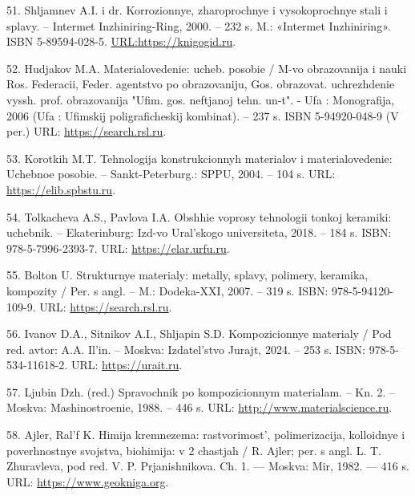 \begin{references}
51. Shljamnev A.I. i dr. Korrozionnye, zharoprochnye i vysokoprochnye
stali i splavy. – Intermet Inzhiniring-Ring, 2000. – 232 s. M.:
«Intermet Inzhiniring». ISBN
5-89594-028-5. \href{URL:https://knigogid.ru/books/1935439-korrozionnostoykie-zharostoykie-i-vysokoprochnye-stali-i-splavy-spravochnik/toread?update_page}{URL:https://knigogid.ru}.

52. Hudjakov M.A. Materialovedenie: ucheb. posobie / M-vo obrazovanija
i nauki Ros. Federacii, Feder. agentstvo po obrazovaniju,
Gos. obrazovat. uchrezhdenie vyssh. prof. obrazovanija
"Ufim. gos. neftjanoj tehn. un-t". - Ufa : Monografija, 2006 (Ufa :
Ufimskij poligraficheskij kombinat). – 237 s. ISBN 5-94920-048-9 (V
per.)
URL: \href{https://search.rsl.ru/ru/record/01002872641?ysclid=m83b6quwea630137991}{https://search.rsl.ru}.

53. Korotkih M.T. Tehnologija konstrukcionnyh materialov i
materialovedenie: Uchebnoe posobie. – Sankt-Peterburg.: SPPU, 2004. –
104
s. URL: \href{https://elib.spbstu.ru/dl/641.pdf/view}{https://elib.spbstu.ru}.

54. Tolkacheva A.S., Pavlova I.A. Obshhie voprosy tehnologii tonkoj
keramiki: uchebnik. – Ekaterinburg: Izd-vo Ural'skogo universiteta,
2018. – 184 s. ISBN:
978-5-7996-2393-7. URL: \href{https://elar.urfu.ru/bitstream/10995/60942/1/978-5-7996-2393-7_2018.pdf?utm_source}{https://elar.urfu.ru}.

55. Bolton U. Strukturnye materialy: metally, splavy, polimery,
keramika, kompozity / Per. s angl. – M.: Dodeka-XXI, 2007. – 319
s. ISBN:
978-5-94120-109-9. URL: \href{https://search.rsl.ru/ru/record/01003036731}{https://search.rsl.ru}.

56. Ivanov D.A., Sitnikov A.I., Shljapin S.D. Kompozicionnye materialy
/ Pod red. avtor: A.A. Il'in. – Moskva: Izdatel'stvo Jurajt, 2024. –
253 s. ISBN:
978-5-534-11618-2. URL: \href{https://urait.ru/book/kompozicionnye-materialy-542670}{https://urait.ru}.

57. Ljubin Dzh. (red.) Spravochnik po kompozicionnym materialam. –
Kn. 2. – Moskva: Mashinostroenie, 1988. – 446
s. URL: \href{http://www.materialscience.ru/subjects/materialovedenie/knigi/spravochnik_po_kompozitsionnim_materialam__pod_red_dzh_lyubina_kn2__m_mashinostroenie_1988__446_s_21_01_2010}{http://www.materialscience.ru}.

58. Ajler, Ral'f K. Himija kremnezema: rastvorimost', polimerizacija,
kolloidnye i poverhnostnye svojstva, biohimija: v 2 chastjah /
R. Ajler; per. s angl. L. T. Zhuravleva, pod
red. V. P. Prjanishnikova. Ch. 1. — Moskva: Mir, 1982. — 416
s. URL: \href{https://www.geokniga.org/books/10605?utm_source}{https://www.geokniga.org}.


\end{references}
